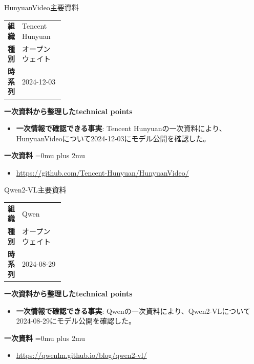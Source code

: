 \begin{technicalnote}{HunyuanVideo}{主要資料}
\begingroup
\begin{tabularx}{\linewidth}{@{}>{\bfseries}p{0.22\linewidth}X@{}}
組織 & Tencent Hunyuan \\
種別 & オープンウェイト \\
時系列 & 2024-12-03 \\
\end{tabularx}
\smallskip
{\bfseries 一次資料から整理したtechnical points}
\begin{itemize}[leftmargin=1.5em,itemsep=0.35em]
\item \textbf{一次情報で確認できる事実}: Tencent Hunyuanの一次資料により、HunyuanVideoについて2024-12-03にモデル公開を確認した。
\end{itemize}
\begin{minipage}{\linewidth}
\begin{samepage}
{\bfseries 一次資料}
\begingroup\sloppy
\Urlmuskip=0mu plus 2mu\relax
\begin{itemize}[leftmargin=1.5em,itemsep=0.25em]
\item {\scriptsize\url{https://github.com/Tencent-Hunyuan/HunyuanVideo/}}
\end{itemize}
\endgroup
\end{samepage}
\end{minipage}
\endgroup
\end{technicalnote}
\medskip

\begin{technicalnote}{Qwen2-VL}{主要資料}
\begingroup
\begin{tabularx}{\linewidth}{@{}>{\bfseries}p{0.22\linewidth}X@{}}
組織 & Qwen \\
種別 & オープンウェイト \\
時系列 & 2024-08-29 \\
\end{tabularx}
\smallskip
{\bfseries 一次資料から整理したtechnical points}
\begin{itemize}[leftmargin=1.5em,itemsep=0.35em]
\item \textbf{一次情報で確認できる事実}: Qwenの一次資料により、Qwen2-VLについて2024-08-29にモデル公開を確認した。
\end{itemize}
\begin{minipage}{\linewidth}
\begin{samepage}
{\bfseries 一次資料}
\begingroup\sloppy
\Urlmuskip=0mu plus 2mu\relax
\begin{itemize}[leftmargin=1.5em,itemsep=0.25em]
\item {\scriptsize\url{https://qwenlm.github.io/blog/qwen2-vl/}}
\end{itemize}
\endgroup
\end{samepage}
\end{minipage}
\endgroup
\end{technicalnote}
\medskip

